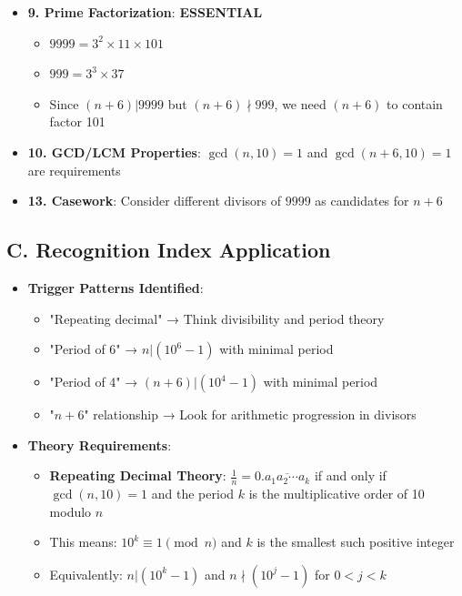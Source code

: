 \documentclass[11pt]{article}
\begin{document}
\begin{conversionbox}
\begin{itemize}[leftmargin=*]
    \item \textbf{9. Prime Factorization}: \textbf{ESSENTIAL}
    \begin{itemize}
        \item $9999 = 3^2 \times 11 \times 101$
        \item $999 = 3^3 \times 37$
        \item Since $(n+6) | 9999$ but $(n+6) \nmid 999$, we need $(n+6)$ to contain factor 101
    \end{itemize}
    
    \item \textbf{10. GCD/LCM Properties}: $\gcd(n, 10) = 1$ and $\gcd(n+6, 10) = 1$ are requirements
    
    \item \textbf{13. Casework}: Consider different divisors of $9999$ as candidates for $n+6$
\end{itemize}

\subsection*{C. Recognition Index Application}
\begin{itemize}[leftmargin=*]
    \item \textbf{Trigger Patterns Identified}:
    \begin{itemize}
        \item "Repeating decimal" → Think divisibility and period theory
        \item "Period of 6" → $n | (10^6 - 1)$ with minimal period
        \item "Period of 4" → $(n+6) | (10^4 - 1)$ with minimal period
        \item "$n+6$" relationship → Look for arithmetic progression in divisors
    \end{itemize}
    
    \item \textbf{Theory Requirements}:
    \begin{itemize}
        \item \textbf{Repeating Decimal Theory}: $\frac{1}{n} = 0.\overline{a_1a_2\cdots a_k}$ if and only if $\gcd(n,10) = 1$ and the period $k$ is the multiplicative order of 10 modulo $n$
        \item This means: $10^k \equiv 1 \pmod{n}$ and $k$ is the smallest such positive integer
        \item Equivalently: $n | (10^k - 1)$ and $n \nmid (10^j - 1)$ for $0 < j < k$
    \end{itemize}
    

\end{itemize}
\end{conversionbox}
\end{document}
